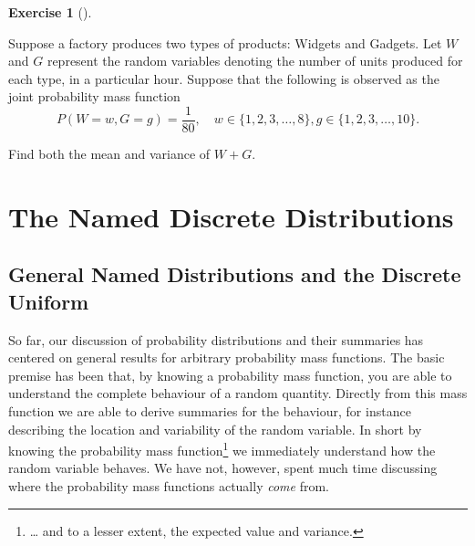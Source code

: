 \documentclass[
  letterpaper,
  DIV=11,
  numbers=noendperiod]{scrreprt}
\theoremstyle{definition}
\newtheorem{exercise}{Exercise}[chapter]
\theoremstyle{definition}
\theoremstyle{definition}
\theoremstyle{remark}
\begin{document}
\begin{exercise}[]\protect\hypertarget{exr-7.6}{}\label{exr-7.6}

Suppose a factory produces two types of products: Widgets and Gadgets.
Let \(W\) and \(G\) represent the random variables denoting the number
of units produced for each type, in a particular hour. Suppose that the
following is observed as the joint probability mass function
\[P(W=w, G=g) = \frac{1}{80}, \quad w \in \{1,2,3,\dots,8\}, g \in \{1,2,3,\dots,10\}.\]

Find both the mean and variance of \(W+G\).

\end{exercise}

\chapter{The Named Discrete
Distributions}\label{the-named-discrete-distributions}

\section{General Named Distributions and the Discrete
Uniform}\label{general-named-distributions-and-the-discrete-uniform}

So far, our discussion of probability distributions and their summaries
has centered on general results for arbitrary probability mass
functions. The basic premise has been that, by knowing a probability
mass function, you are able to understand the complete behaviour of a
random quantity. Directly from this mass function we are able to derive
summaries for the behaviour, for instance describing the location and
variability of the random variable. In short by knowing the probability
mass function\footnote{\ldots{} and to a lesser extent, the expected
  value and variance.} we immediately understand how the random variable
behaves. We have not, however, spent much time discussing where the
probability mass functions actually \emph{come} from.
\end{document}
